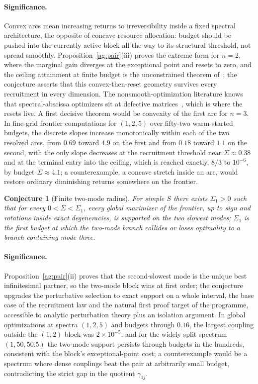 \documentclass[11pt]{article}
\newtheorem{conjecture}{Conjecture}
\theoremstyle{definition}
\begin{document}
\paragraph{Significance.}
Convex arcs mean increasing returns to irreversibility inside a fixed spectral architecture, the opposite of concave resource allocation: budget should be pushed into the currently active block all the way to its structural threshold, not spread smoothly.  Proposition~\ref{ag:pair}(iii) proves the extreme form for $n=2$, where the marginal gain diverges at the exceptional point and resets to zero, and the ceiling attainment at finite budget is the unconstrained theorem of~\cite{LNP13}; the conjecture asserts that this convex-then-reset geometry survives every recruitment in every dimension.  The nonsmooth-optimization literature knows that spectral-abscissa optimizers sit at defective matrices~\cite{BLO01}, which is where the resets live.  A first decisive theorem would be convexity of the first arc for $n=3$.  In fine-grid frontier computations for $(1,2,5)$ over fifty-two warm-started budgets, the discrete slopes increase monotonically within each of the two resolved arcs, from $0.69$ toward $4.9$ on the first and from $0.18$ toward $1.1$ on the second, with the only slope decreases at the recruitment threshold near $\Sigma\approx0.38$ and at the terminal entry into the ceiling, which is reached exactly, $8/3$ to $10^{-6}$, by budget $\Sigma\approx4.1$; a counterexample, a concave stretch inside an arc, would restore ordinary diminishing returns somewhere on the frontier.

\begin{conjecture}[Finite two-mode radius]\label{ag4}
For simple $S$ there exists $\Sigma_1>0$ such that for every $0<\Sigma<\Sigma_1$, every global maximizer of the frontier, up to sign and rotations inside exact degeneracies, is supported on the two slowest modes; $\Sigma_1$ is the first budget at which the two-mode branch collides or loses optimality to a branch containing mode three.
\end{conjecture}

\paragraph{Significance.}
Proposition~\ref{ag:pair}(ii) proves that the second-slowest mode is the unique best infinitesimal partner, so the two-mode block wins at first order; the conjecture upgrades the perturbative selection to exact support on a whole interval, the base case of the recruitment law and the natural first proof target of the programme, accessible to analytic perturbation theory plus an isolation argument.  In global optimizations at spectra $(1,2,5)$ and budgets through $0.16$, the largest coupling outside the $(1,2)$ block was $2\times10^{-5}$, and for the widely split spectrum $(1,50,50.5)$ the two-mode support persists through budgets in the hundreds, consistent with the block's exceptional-point cost; a counterexample would be a spectrum where dense couplings beat the pair at arbitrarily small budget, contradicting the strict gap in the quotient $\gamma_{1j}$.
\end{document}
